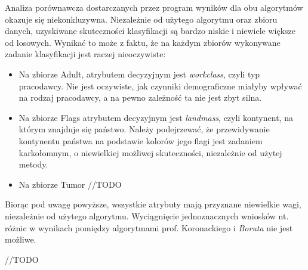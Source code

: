 \documentclass{article}
\begin{document}
Analiza porównawcza dostarczanych przez program wyników dla obu algorytmów okazuje się niekonkluzywna. Niezależnie od użytego algorytmu oraz zbioru danych, uzyskiwane skuteczności klasyfikacji są bardzo niskie i niewiele większe od losowych. Wynikać to może z faktu, że na każdym zbiorów wykonywane zadanie klasyfikacji jest raczej nieoczywiste:
\begin{itemize}
	\item Na zbiorze Adult, atrybutem decyzyjnym jest \emph{workclass}, czyli typ pracodawcy. Nie jest oczywiste, jak czynniki demograficzne miałyby wpływać na rodzaj pracodawcy, a na pewno zależność ta nie jest zbyt silna. 
	\item Na zbiorze Flags atrybutem decyzyjnym jest \emph{landmass}, czyli kontynent, na którym znajduje się państwo. Należy podejrzewać, że przewidywanie kontynentu państwa na podstawie kolorów jego flagi jest zadaniem karkołomnym, o niewielkiej możliwej skuteczności, niezależnie od użytej metody. 
	\item Na zbiorze Tumor //TODO
\end{itemize}

Biorąc pod uwagę powyższe, wszystkie atrybuty mają przyznane niewielkie wagi, niezależnie od użytego algorytmu. Wyciągnięcie jednoznacznych wniosków nt. różnic w wynikach pomiędzy algorytmami prof. Koronackiego i \emph{Boruta} nie jest możliwe. 

//TODO
\end{document}
